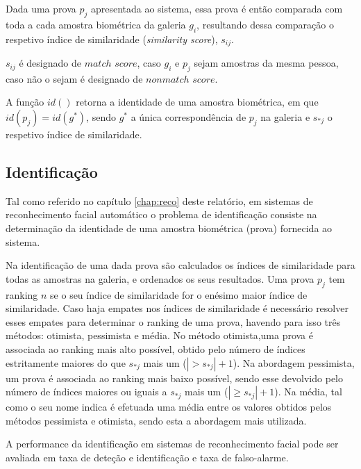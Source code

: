 Dada uma prova $p_j$ apresentada ao sistema, essa prova é então comparada com toda a cada amostra biométrica da galeria $g_i$, resultando dessa comparação o respetivo índice de similaridade (\textit{similarity score}), $s_{ij}$.

$s_{ij}$ é designado de $match$ $score$, caso $g_i$ e $p_j$ sejam amostras da mesma pessoa, caso não o sejam é designado de $nonmatch$ $score$.

A função $id()$ retorna a identidade de uma amostra biométrica, em que $id(p_j) = id(g^*)$, sendo $g^*$ a única correspondência de $p_j$ na galeria e $s_{*j}$ o respetivo índice de similaridade.

\subsection{Identificação}
Tal como referido no capítulo \ref{chap:reco} deste relatório, em sistemas de reconhecimento facial automático o problema de identificação consiste na determinação da identidade de uma amostra biométrica (prova) fornecida ao sistema.

Na identificação de uma dada prova são calculados os índices de similaridade para todas as amostras na galeria, e ordenados os seus resultados. Uma prova $p_j$ tem ranking $n$ se o seu índice de similaridade for o enésimo maior índice de similaridade. Caso haja empates nos índices de similaridade é necessário resolver esses empates para determinar o ranking de uma prova, havendo para isso três métodos: otimista, pessimista e média. No método otimista,uma prova é associada ao ranking mais alto possível, obtido pelo número de índices estritamente maiores do que $s_{*j}$ mais um ($|> s_{*j}| + 1$). Na abordagem pessimista, um prova é associada ao ranking mais baixo possível, sendo esse devolvido pelo número de índices maiores ou iguais a $s_{*j}$ mais um ($|\geqslant s_{*j}| + 1$). Na média, tal como o seu nome indica é efetuada uma média entre os valores obtidos pelos métodos pessimista e otimista, sendo esta a abordagem mais utilizada. 

A performance da identificação em sistemas de reconhecimento facial pode ser avaliada em taxa de deteção e identificação e taxa de falso-alarme.

